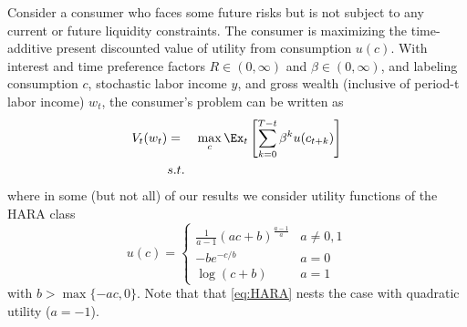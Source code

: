 
Consider a consumer who faces some future risks but is not subject to any current or future liquidity constraints.  The consumer is maximizing the time-additive present discounted value of utility from consumption $u(c)$.  With interest and time preference factors $R \in (0,\infty)$ and $\beta \in (0,\infty)$, and labeling consumption $c$, stochastic labor income $y$, and gross wealth (inclusive of period-t labor income) $w_{t}$, the consumer's problem can be written as
\begin{eqnarray*}
V_{t}(w_{t}) &=&
                 \max_{c} \Ex_{t}\left[\sum_{k=0}^{T-t}\beta^{k} u({c_{t+k}})\right]   \label{eq:valuefn} \\
   & s.t. &  \nonumber
\nonumber
\end{eqnarray*}
where in some (but not all) of our results we consider utility functions of the HARA class
\begin{equation}\label{eq:HARA}
  u(c) = \begin{cases} \frac{1}{a - 1}\left(ac + b\right)^{\frac{a-1}{a}} & a \neq 0,1 \\
-be^{-c/b} & a = 0 \\
\log(c + b) & a = 1 \end{cases} \end{equation}
with $b > \max\{- ac,0\}$. Note that that \eqref{eq:HARA} nests the case with quadratic utility ($a = -1$).

